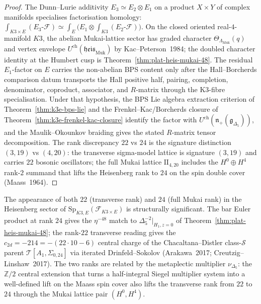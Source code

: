 \begin{proof}
The Dunn--Lurie additivity $E_3 \simeq E_2 \otimes E_1$ on a product
$X \times Y$ of complex manifolds specialises factorisation homology:
$\int_{K3 \times E}(E_3\text{-}\mathcal{F}) \simeq
\int_E\!\bigl(E_1 \otimes \int_{K3}(E_2\text{-}\mathcal{F})\bigr)$.
On the closed oriented real-$4$-manifold $K3$, the abelian
Mukai-lattice sector has graded character
$\Theta_{\Lambda_{\mathrm{Muk}}}(q)$ and vertex envelope
$U^{\mathrm{ch}}(\mathfrak{heis}_{\mathrm{Muk}})$ by
Kac--Peterson~1984; the doubled character identity at the Humbert cusp
is Theorem~\ref{thm:plat-heis-mukai-48}. The residual $E_1$-factor on
$E$ carries the non-abelian BPS content only after the Hall--Borcherds
comparison datum transports the Hall positive half, pairing,
completion, denominator, coproduct, associator, and $R$-matrix through
the K3-fibre specialisation. Under that hypothesis, the BPS Lie algebra
extraction criterion of Theorem~\ref{thm:k3e-bps-lie} and the
Frenkel--Kac/Borcherds closure of
Theorem~\ref{thm:k3e-frenkel-kac-closure} identify the factor with
$U^{\mathrm{ch}}(\mathfrak{n}_+(\mathfrak{g}_{\Delta_5}))$, and the
Maulik--Okounkov braiding gives the stated $R$-matrix tensor
decomposition. The rank discrepancy $22$ vs $24$ is the signature
distinction $(3,19)$ vs $(4,20)$: the transverse sigma-model lattice is
signature $(3,19)$ and carries $22$ bosonic oscillators; the full Mukai
lattice $\mathrm{II}_{4,20}$ includes the $H^0\oplus H^4$ rank-$2$
summand that lifts the Heisenberg rank to $24$ on the spin double cover
(Maass~1964).
\end{proof}

\begin{remark}
\label{rem:k3e-platonic-heis-rank-22-24}
The appearance of both $22$ (transverse rank) and $24$ (full Mukai rank) in the Heisenberg sector of $\mathrm{Sp}_{K3, E}(\mathcal{F}_{K3 \times E})$ is structurally significant. The bar Euler product at rank $24$ gives the $\eta^{-48}$ match to $\Delta_5^{-2}|_{H_1, z = 0}$ of Theorem~\ref{thm:plat-heis-mukai-48}; the rank-$22$ transverse reading gives the $c_{2d} = -214 = -(22 \cdot 10 - 6)$ central charge of the Chacaltana--Distler class-$\mathcal{S}$ parent $\mathcal{T}[A_1, \Sigma_{0, 24}]$ via iterated Drinfeld--Sokolov (Arakawa~2017; Creutzig--Linshaw~2017). The two ranks are related by the metaplectic multiplier $\nu_{\Delta_5}$: the $\mathbb{Z}/2$ central extension that turns a half-integral Siegel multiplier system into a well-defined lift on the Maass spin cover also lifts the transverse rank from $22$ to $24$ through the Mukai lattice pair $(H^0, H^4)$.
\end{remark}

